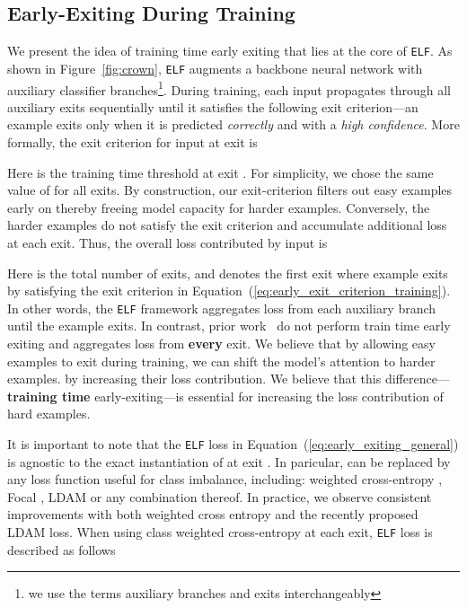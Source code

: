 \documentclass{article}
\newcommand{\method}{\texttt{ELF}\xspace}
\begin{document}
\subsection{Early-Exiting During Training}
\label{subsec:exit_training}
We present the idea of training time early exiting that lies at the core of \method.
As shown in Figure~\ref{fig:crown}, \method{} augments a backbone neural network with  auxiliary classifier branches\footnote{we use the terms auxiliary branches and exits interchangeably}. 
During training, each input  propagates through all auxiliary exits sequentially until it satisfies the following exit criterion---an example exits only when it is predicted \textit{correctly} and with a \textit{high confidence}. 
More formally, the exit criterion  for input   at exit  is

 

Here  is the training time threshold at exit . For simplicity, we chose the same value 
of  for all exits.
By construction, our exit-criterion filters out easy examples early on thereby
freeing model capacity for harder examples. 
Conversely, the harder examples do not satisfy the exit criterion and accumulate additional loss at each exit. 
Thus, the overall loss contributed by input  is 



Here  is the total number of exits, and   denotes the first exit where example  exits by satisfying the exit criterion in Equation~(\ref{eq:early_exit_criterion_training}).
In other words, the \method{} framework aggregates loss from each auxiliary branch until the example exits. 
In contrast, prior work~\cite{teerapittayanon2016branchynet, Huang2018MultiScaleDN} do not perform train time early exiting and aggregates loss from \textbf{every} exit.
We believe that by allowing easy examples to exit during training, we can shift the model's attention to harder examples.
by increasing their loss contribution.
We believe that this difference---\textbf{training time} early-exiting---is essential for increasing the loss contribution of hard examples.

It is important to note that the \method{} loss in Equation~(\ref{eq:early_exiting_general}) is agnostic to the exact instantiation of  at exit . 
In paricular,  can be replaced by any loss function useful for class imbalance, including: weighted cross-entropy \cite{cui2019class}, Focal \cite{lin2017focal}, LDAM \cite{cao2019learning} or any combination thereof. 
In practice, we observe consistent improvements with both weighted cross entropy and the recently proposed LDAM loss. 
When using class weighted cross-entropy at each exit, \method{} loss is described as follows
\end{document}
